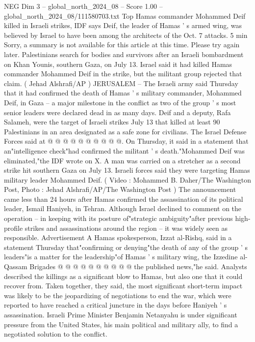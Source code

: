 \begin{textsample}{NEG Dim 3 – global\_north\_2024\_08 – Score 1.00 – global\_north\_2024\_08/111580703.txt}  \label{ex:f3_neg_314}
Top Hamas commander Mohammed Deif killed in Israeli strikes, IDF says Deif, the leader of Hamas ' s armed wing, was believed by Israel to have been among the architects of the Oct. 7 attacks. 5 min Sorry, a summary is not available for this article at this time.
Please try again later.
Palestinians search for bodies and survivors after an Israeli bombardment on Khan Younis, southern Gaza, on July 13.
Israel said it had killed Hamas commander Mohammed Deif in the strike, but the militant group rejected that claim. ( Jehad Alshrafi/AP ) JERUSALEM -- The Israeli army said Thursday that it had confirmed the death of Hamas ' s military commander, Mohammed Deif, in Gaza -- a major milestone in the conflict as two of the group ' s most senior leaders were declared dead in as many days.
Deif and a deputy, Rafa Salameh, were the target of Israeli strikes July 13 that killed at least 90 Palestinians in an area designated as a safe zone for civilians.
The Israel Defense Forces said at @ @ @ @ @ @ @ @ @ @.
On Thursday, it said in a statement that an"intelligence check"had confirmed the militant ' s death."Mohammed Deif was eliminated,"the IDF wrote on X.
A man was carried on a stretcher as a second strike hit southern Gaza on July 13.
Israeli forces said they were targeting Hamas military leader Mohammed Deif. ( Video : Mohammed B.
Daher/The Washington Post, Photo : Jehad Alshrafi/AP/The Washington Post ) The announcement came less than 24 hours after Hamas confirmed the assassination of its political leader, Ismail Haniyeh, in Tehran.
Although Israel declined to comment on the operation -- in keeping with its posture of"strategic ambiguity"after previous high-profile strikes and assassinations around the region -- it was widely seen as responsible.
Advertisement A Hamas spokesperson, Izzat al-Rishq, said in a statement Thursday that"confirming or denying"the death of any of the group ' s leaders"is a matter for the leadership"of Hamas ' s military wing, the Izzedine al-Qassam Brigades @ @ @ @ @ @ @ @ @ @ the published news,"he said.
Analysts described the killings as a significant blow to Hamas, but also one that it could recover from.
Taken together, they said, the most significant short-term impact was likely to be the jeopardizing of negotiations to end the war, which were reported to have reached a critical juncture in the days before Haniyeh ' s assassination.
Israeli Prime Minister Benjamin Netanyahu is under significant pressure from the United States, his main political and military ally, to find a negotiated solution to the conflict.

\end{textsample}
